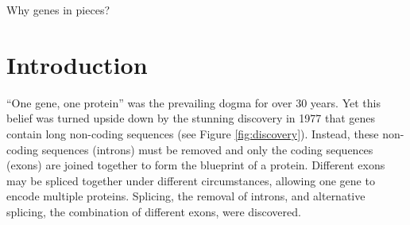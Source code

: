 \begin{savequote}[8cm]
Why genes in pieces?
\end{savequote}

\chapter{\label{ch:1-intro}Introduction} 
``One gene, one protein'' was the prevailing dogma for over 30 years. Yet this belief was turned upside down by the stunning discovery in 1977 that genes contain long non-coding sequences \cite{discoveryofsplicing} (see Figure \ref{fig:discovery}). Instead, these non-coding sequences (introns) must be removed and only the coding sequences (exons) are joined together to form the blueprint of a protein. Different exons may be spliced together under different circumstances, allowing one gene to encode multiple proteins. Splicing, the removal of introns, and alternative splicing, the combination of different exons, were discovered. 

%

